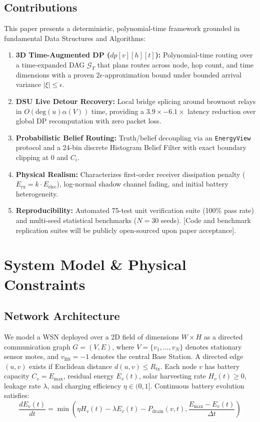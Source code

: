 \documentclass[conference]{IEEEtran}
\begin{document}
\subsection{Contributions}
This paper presents a deterministic, polynomial-time framework grounded in fundamental Data Structures and Algorithms:
\begin{enumerate}
    \item \textbf{3D Time-Augmented DP ($dp[v][h][t]$):} Polynomial-time routing over a time-expanded DAG $\mathcal{G}_T$ that plans routes across node, hop count, and time dimensions with a proven $2\epsilon$-approximation bound under bounded arrival variance $|\xi| \le \epsilon$.
    \item \textbf{DSU Live Detour Recovery:} Local bridge splicing around brownout relays in $O(\text{deg}(u)\alpha(V))$ time, providing a $3.9\times - 6.1\times$ latency reduction over global DP recomputation with zero packet loss.
    \item \textbf{Probabilistic Belief Routing:} Truth/belief decoupling via an \texttt{EnergyView} protocol and a 24-bin discrete Histogram Belief Filter with exact boundary clipping at 0 and $C_i$.
    \item \textbf{Physical Realism:} Characterizes first-order receiver dissipation penalty ($E_{\text{rx}} = k \cdot E_{\text{elec}}$), log-normal shadow channel fading, and initial battery heterogeneity.
    \item \textbf{Reproducibility:} Automated 75-test unit verification suite (100\% pass rate) and multi-seed statistical benchmarks ($N=30$ seeds). [Code and benchmark replication suites will be publicly open-sourced upon paper acceptance].
\end{enumerate}

\section{System Model \& Physical Constraints}

\subsection{Network Architecture}
We model a WSN deployed over a 2D field of dimensions $W \times H$ as a directed communication graph $G = (V, E)$, where $V = \{v_1, \dots, v_N\}$ denotes stationary sensor motes, and $v_{\text{BS}} = -1$ denotes the central Base Station. A directed edge $(u, v)$ exists if Euclidean distance $d(u, v) \le R_{\text{tx}}$. Each node $v$ has battery capacity $C_v = E_{\text{max}}$, residual energy $E_v(t)$, solar harvesting rate $H_v(t) \ge 0$, leakage rate $\lambda$, and charging efficiency $\eta \in (0, 1]$. Continuous battery evolution satisfies:
\begin{equation}
\frac{dE_v(t)}{dt} = \min\left( \eta H_v(t) - \lambda E_v(t) - P_{\text{drain}}(v, t), \frac{E_{\text{max}} - E_v(t)}{\Delta t} \right)
\end{equation}
\end{document}
